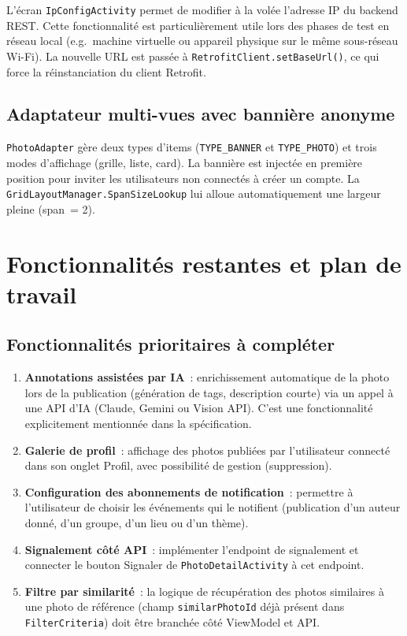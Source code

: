 \documentclass[12pt, a4paper, openany]{report}
\begin{document}
L'écran \texttt{IpConfigActivity} permet de modifier à la volée l'adresse IP du backend
REST. Cette fonctionnalité est particulièrement utile lors des phases de test en réseau
local (e.g.\ machine virtuelle ou appareil physique sur le même sous-réseau Wi-Fi). La
nouvelle URL est passée à \texttt{RetrofitClient.setBaseUrl()}, ce qui force la
réinstanciation du client Retrofit.

\section{Adaptateur multi-vues avec bannière anonyme}

\texttt{PhotoAdapter} gère deux types d'items (\texttt{TYPE\_BANNER} et \texttt{TYPE\_PHOTO})
et trois modes d'affichage (grille, liste, card). La bannière est injectée en première
position pour inviter les utilisateurs non connectés à créer un compte. La
\texttt{GridLayoutManager.SpanSizeLookup} lui alloue automatiquement une largeur pleine
(span~= 2).

\chapter{Fonctionnalités restantes et plan de travail}

\section{Fonctionnalités prioritaires à compléter}

\begin{warningbox}
\begin{enumerate}[leftmargin=*]
  \item \textbf{Annotations assistées par IA}~: enrichissement automatique de la photo
        lors de la publication (génération de tags, description courte) via un appel à
        une API d'IA (Claude, Gemini ou Vision API). C'est une fonctionnalité explicitement
        mentionnée dans la spécification.
  \item \textbf{Galerie de profil}~: affichage des photos publiées par l'utilisateur
        connecté dans son onglet Profil, avec possibilité de gestion (suppression).
  \item \textbf{Configuration des abonnements de notification}~: permettre à l'utilisateur
        de choisir les événements qui le notifient (publication d'un auteur donné, d'un
        groupe, d'un lieu ou d'un thème).
  \item \textbf{Signalement côté API}~: implémenter l'endpoint de signalement et connecter
        le bouton Signaler de \texttt{PhotoDetailActivity} à cet endpoint.
  \item \textbf{Filtre par similarité}~: la logique de récupération des photos similaires
        à une photo de référence (champ \texttt{similarPhotoId} déjà présent dans
        \texttt{FilterCriteria}) doit être branchée côté ViewModel et API.
\end{enumerate}
\end{warningbox}
\end{document}
